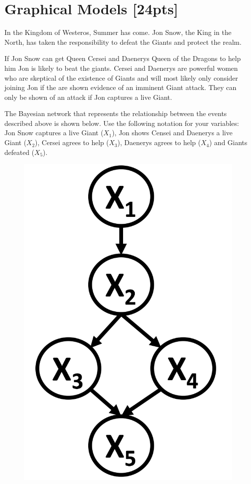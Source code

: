 \section{Graphical Models [24pts]}

In the Kingdom of Westeros, Summer has come. Jon Snow, the King in the North, has taken the responsibility to defeat the Giants and protect the realm.

If Jon Snow can get Queen Cersei and Daenerys Queen of the Dragons to help him Jon is likely to beat the giants. Cersei and Daenerys are powerful women who are skeptical of the existence of Giants and will most likely only consider joining Jon if the are shown evidence of an imminent Giant attack. They can only be shown of an attack if Jon captures a live Giant.

The Bayesian network that represents the relationship between the events described above is shown below. Use the following notation for your variables: Jon Snow captures a live Giant ($X_1$), Jon shows Censei and Daenerys a live Giant  ($X_2$), Cersei agrees to help ($X_3$), Daenerys agrees to help ($X_4$) and Giants defeated ($X_5$).
\begin{figure}[!hbtp]
\centering
\includegraphics[scale=0.3]{figures/q2.png}
\end{figure}


